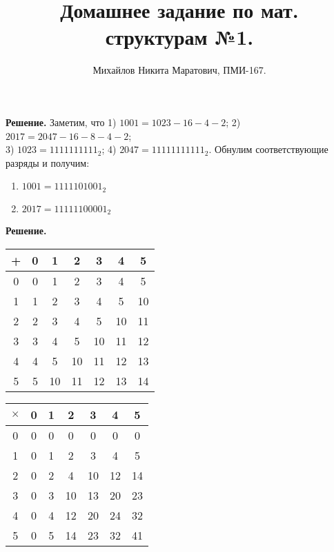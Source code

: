 \documentclass[a4paper, 12pt]{article}
\title{
	Домашнее задание по мат. структурам №1.
}
\author{Михайлов Никита Маратович, ПМИ-167.
}
\date{}
\begin{document}
\maketitle
\begin{spacing}{1}
		
\begin{center}
\end{center}
\textbf{Решение.} Заметим, что 1) $1001 = 1023 - 16 - 4 - 2$; 2) $2017 = 2047 - 16 - 8 - 4 - 2$; \\3) $1023 = 1111111111_2$; 
4) $2047 = 11111111111_2$. Обнулим соответствующие разряды и получим:
\begin{enumerate}
	\item $1001 = 1111101001_2$
	\item $2017 = 11111100001_2$
\end{enumerate}


\begin{center}
\end{center}
\textbf{Решение.}\\[10pt]
\begin{minipage}[c]{100mm}
	\begin{tabular}{| c | c | c | c | c | c | c |}
		\hline
		+ & 0 & 1 & 2 & 3 & 4 & 5 \\
		\hline
		0 & 0 & 1 & 2 & 3 & 4 & 5 \\ 
		\hline
		1 & 1 & 2 & 3 & 4 & 5 & 10 \\ 
		\hline
		2 & 2 & 3 & 4 & 5 & 10 & 11 \\ 
		\hline
		3 & 3 & 4 & 5 & 10 & 11 & 12 \\ 
		\hline
		4 & 4 & 5 & 10 & 11 & 12 & 13 \\ 
		\hline
		5 & 5 & 10 & 11 & 12 & 13 & 14 \\ 
		\hline
	\end{tabular}
\end{minipage}
\begin{minipage}[c]{100mm}
	\begin{tabular}{| c | c | c | c | c | c | c |}
		\hline
		$\times$ & 0 & 1 & 2 & 3 & 4 & 5 \\
		\hline
		0 & 0 & 0 & 0 & 0 & 0 & 0 \\ 
		\hline
		1 & 0 & 1 & 2 & 3 & 4 & 5 \\ 
		\hline
		2 & 0 & 2 & 4 & 10 & 12 & 14 \\ 
		\hline
		3 & 0 & 3 & 10 & 13 & 20 & 23 \\ 
		\hline
		4 & 0 & 4 & 12 & 20 & 24 & 32 \\ 
		\hline
		5 & 0 & 5 & 14 & 23 & 32 & 41 \\ 
		\hline
	\end{tabular}
\end{minipage}
\\


\end{spacing}
\end{document}
